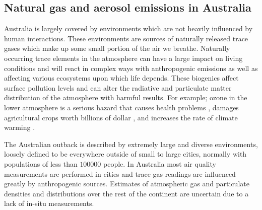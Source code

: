 \subsection{Natural gas and aerosol emissions in Australia}

Australia is largely covered by environments which are not heavily influenced by human interactions.
These environments are sources of naturally released trace gases which make up some small portion of the air we breathe.
Naturally occurring trace elements in the atmosphere can have a large impact on living conditions and will react in complex ways with anthropogenic emissions as well as affecting various ecosystems upon which life depends.
These biogenics affect surface pollution levels and can alter the radiative and particulate matter distribution of the atmosphere with harmful results.
For example; ozone in the lower atmosphere is a serious hazard that causes health problems \cite{Hsieh_2013}, damages agricultural crops worth billions of dollar \cite{Avnery_2011}, and increases the rate of climate warming \cite{IPCC_2013_chap8}.

The Australian outback is described by extremely large and diverse environments, loosely defined to be everywhere outside of small to large cities, normally with populations of less than $100000$ people.
In Australia most air quality measurements are performed in cities and trace gas readings are influenced greatly by anthropogenic sources.
Estimates of atmospheric gas and particulate densities and distributions over the rest of the continent are uncertain due to a lack of in-situ measurements.
  